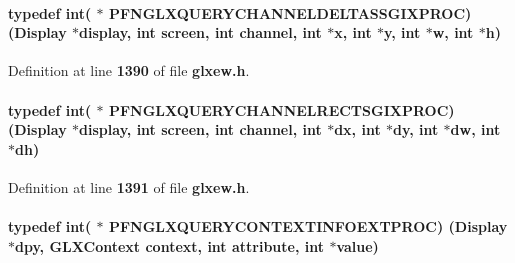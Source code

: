 \paragraph[{P\+F\+N\+G\+L\+X\+Q\+U\+E\+R\+Y\+C\+H\+A\+N\+N\+E\+L\+D\+E\+L\+T\+A\+S\+S\+G\+I\+X\+P\+R\+OC}]{\setlength{\rightskip}{0pt plus 5cm}typedef {\bf int}( $\ast$  P\+F\+N\+G\+L\+X\+Q\+U\+E\+R\+Y\+C\+H\+A\+N\+N\+E\+L\+D\+E\+L\+T\+A\+S\+S\+G\+I\+X\+P\+R\+OC) (Display $\ast${\bf display}, {\bf int} screen, {\bf int} channel, {\bf int} $\ast${\bf x}, {\bf int} $\ast${\bf y}, {\bf int} $\ast$w, {\bf int} $\ast${\bf h})}\label{glxew_8h_a5d6ac3fdae7575a99a08236aebe417e6}


Definition at line {\bf 1390} of file {\bf glxew.\+h}.

\paragraph[{P\+F\+N\+G\+L\+X\+Q\+U\+E\+R\+Y\+C\+H\+A\+N\+N\+E\+L\+R\+E\+C\+T\+S\+G\+I\+X\+P\+R\+OC}]{\setlength{\rightskip}{0pt plus 5cm}typedef {\bf int}( $\ast$  P\+F\+N\+G\+L\+X\+Q\+U\+E\+R\+Y\+C\+H\+A\+N\+N\+E\+L\+R\+E\+C\+T\+S\+G\+I\+X\+P\+R\+OC) (Display $\ast${\bf display}, {\bf int} screen, {\bf int} channel, {\bf int} $\ast$dx, {\bf int} $\ast$dy, {\bf int} $\ast$dw, {\bf int} $\ast$dh)}\label{glxew_8h_a3cb0333a45d6f824b2a8f2e8a2a2a842}


Definition at line {\bf 1391} of file {\bf glxew.\+h}.

\paragraph[{P\+F\+N\+G\+L\+X\+Q\+U\+E\+R\+Y\+C\+O\+N\+T\+E\+X\+T\+I\+N\+F\+O\+E\+X\+T\+P\+R\+OC}]{\setlength{\rightskip}{0pt plus 5cm}typedef {\bf int}( $\ast$  P\+F\+N\+G\+L\+X\+Q\+U\+E\+R\+Y\+C\+O\+N\+T\+E\+X\+T\+I\+N\+F\+O\+E\+X\+T\+P\+R\+OC) (Display $\ast$dpy, {\bf G\+L\+X\+Context} context, {\bf int} attribute, {\bf int} $\ast$value)}\label{glxew_8h_a2e72e2e4d581898f4b53fa4780735128}


